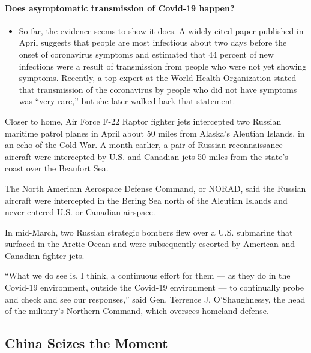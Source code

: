 \begin{itemize}
{  \paragraph{Does asymptomatic transmission of Covid-19
  happen?}\label{does-asymptomatic-transmission-of-covid-19-happen}}

  \begin{itemize}
  \tightlist
  \item
    So far, the evidence seems to show it does. A widely cited
    \href{https://www.nature.com/articles/s41591-020-0869-5}{paper}
    published in April suggests that people are most infectious about
    two days before the onset of coronavirus symptoms and estimated that
    44 percent of new infections were a result of transmission from
    people who were not yet showing symptoms. Recently, a top expert at
    the World Health Organization stated that transmission of the
    coronavirus by people who did not have symptoms was ``very rare,''
    \href{https://www.nytimes.com/2020/06/09/world/coronavirus-updates.html?action=click\&pgtype=Article\&state=default\&region=MAIN_CONTENT_3\&context=storylines_faq\#link-1f302e21}{but
    she later walked back that statement.}
  \end{itemize}
\end{itemize}

Closer to home, Air Force F-22 Raptor fighter jets intercepted two
Russian maritime patrol planes in April about 50 miles from Alaska's
Aleutian Islands, in an echo of the Cold War. A month earlier, a pair of
Russian reconnaissance aircraft were intercepted by U.S. and Canadian
jets 50 miles from the state's coast over the Beaufort Sea.

The North American Aerospace Defense Command, or NORAD, said the Russian
aircraft were intercepted in the Bering Sea north of the Aleutian
Islands and never entered U.S. or Canadian airspace.

In mid-March, two Russian strategic bombers flew over a U.S. submarine
that surfaced in the Arctic Ocean and were subsequently escorted by
American and Canadian fighter jets.

``What we do see is, I think, a continuous effort for them --- as they
do in the Covid-19 environment, outside the Covid-19 environment --- to
continually probe and check and see our responses,'' said Gen. Terrence
J. O'Shaughnessy, the head of the military's Northern Command, which
oversees homeland defense.

\hypertarget{china-seizes-the-moment}{%
\subsection{China Seizes the Moment}\label{china-seizes-the-moment}}

